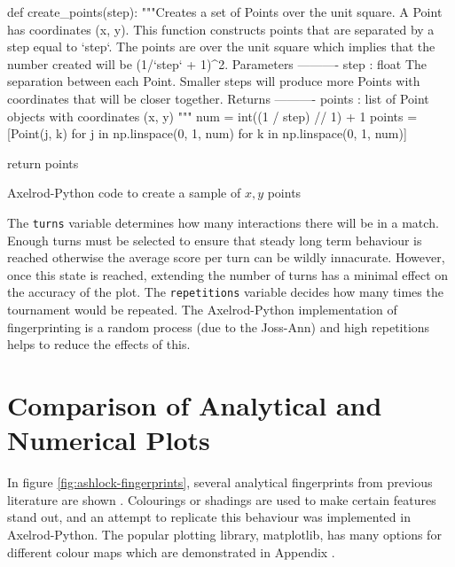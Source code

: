 \begin{listing}[hbtp!]
\begin{SourceCode}
def create_points(step):
    """Creates a set of Points over the unit square.
    A Point has coordinates (x, y). This function constructs points that are
    separated by a step equal to `step`. The points are over the unit
    square which implies that the number created will be (1/`step` + 1)^2.
    Parameters
    ----------
    step : float
        The separation between each Point. Smaller steps will produce more
        Points with coordinates that will be closer together.
    Returns
    ----------
    points : list
        of Point objects with coordinates (x, y)
    """
    num = int((1 / step) // 1) + 1
    points = [Point(j, k) for j in np.linspace(0, 1, num)
              for k in np.linspace(0, 1, num)]

    return points
\end{SourceCode}
\caption{Axelrod-Python code to create a sample of $x,y$ points}
\label{lst:create-points}
\end{listing}

The \texttt{turns} variable determines how many interactions there will be in a match.
Enough turns must be selected to ensure that steady long term behaviour is reached otherwise the average score per turn can be wildly innacurate.
However, once this state is reached, extending the number of turns has a minimal effect on the accuracy of the plot.
The \texttt{repetitions} variable decides how many times the tournament would be repeated.
The Axelrod-Python implementation of fingerprinting is a random process (due to the Joss-Ann) and high repetitions helps to reduce the effects of this.


\section{Comparison of Analytical and Numerical Plots}

In figure \ref{fig:ashlock-fingerprints}, several analytical fingerprints from previous literature are shown \cite{Ashlock2004, Ashlock2008}.
Colourings or shadings are used to make certain features stand out, and an attempt to replicate this behaviour was implemented in Axelrod-Python.
The popular plotting library, matplotlib, has many options for different colour maps which are demonstrated in Appendix . %

